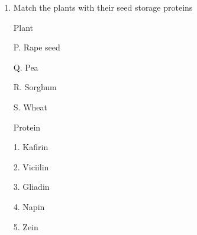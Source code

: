\documentclass[journal]{IEEEtran}
\begin{document}
\begin{enumerate}
\begin{minipage}{0.5\textwidth}
\begin{flushleft}
Gene insert

P. bar

Q. vip3A

R. B-ley

S. gah-11

		\end{flushleft}
		\end{minipage}
	\begin{minipage}{0.5\textwidth}
		\begin{flushleft}


Aspects of crop improvement

1. Tolerance to heavy metals

2. Nutritional improvement with increased vitamin A

3. Insect resistance

4. Herbicide resistance

5. Delayed ripening

6. Resistance to fungal infection

		\end{flushleft}
		\end{minipage}

(A) P-4,Q-3,R-5,S-6

(B) P-4,Q-3,R-2,S-1

(C) P-2,Q-4,R-5,S-3

(D) P-4, Q-2,R-6,S-1

\item {Match the plants with their seed storage proteins}
\newline
\begin{minipage}{0.5\textwidth}
	\begin{flushleft}


Plant

P. Rape seed

Q. Pea

R. Sorghum

S. Wheat

		\end{flushleft}
		\end{minipage}
	\begin{minipage}{0.5\textwidth}
		\begin{flushleft}

Protein

1. Kafirin

2. Viciilin

3. Gliadin

4. Napin

5. Zein


\end{flushleft}
\end{minipage}
\end{enumerate}
\end{document}
